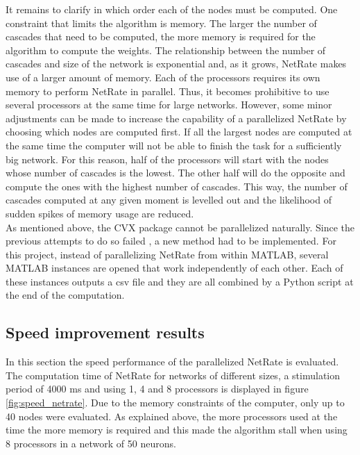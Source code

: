 It remains to clarify in which order each of the nodes must be computed. One constraint that limits the algorithm is memory. The larger the number of cascades that need to be computed, the more memory is required for the algorithm to compute the weights. The relationship between the number of cascades and size of the network is exponential and, as it grows, NetRate makes use of a larger amount of memory. Each of the processors requires its own memory to perform NetRate in parallel. Thus, it becomes prohibitive to use several processors at the same time for large networks. However, some minor adjustments can be made to increase the capability of a parallelized NetRate by choosing which nodes are computed first. If all the largest nodes are computed at the same time the computer will not be able to finish the task for a sufficiently big network. For this reason, half of the processors will start with the nodes whose number of cascades is the lowest. The other half will do the opposite and compute the ones with the highest number of cascades. This way, the number of cascades computed at any given moment is levelled out and the likelihood of sudden spikes of memory usage are reduced. \\

As mentioned above, the CVX package cannot be parallelized naturally. Since the previous attempts to do so failed \cite{pranav_report}, a new method had to be implemented. For this project, instead of parallelizing NetRate from within MATLAB, several MATLAB instances are opened that work independently of each other. Each of these instances outputs a csv file and they are all combined by a Python script at the end of the computation. 

\subsection{Speed improvement results}

In this section the speed performance of the parallelized NetRate is evaluated. The computation time of NetRate for networks of different sizes, a stimulation period of 4000 ms and using 1, 4 and 8 processors is displayed in figure \ref{fig:speed_netrate}. Due to the memory constraints of the computer, only up to 40 nodes were evaluated. As explained above, the more processors used at the time the more memory is required and this made the algorithm stall when using 8 processors in a network of 50 neurons.\\

